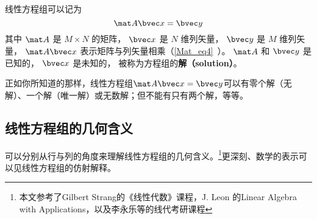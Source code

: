 
\begin{issues}
\issueDraft
\end{issues}


线性方程组可以记为
\begin{equation}\label{LinEq_eq1}
\mat A \bvec x = \bvec y
\end{equation}
其中 $\mat A$ 是 $M \times N$ 的矩阵， $\bvec x$ 是 $N$ 维列矢量， $\bvec y$ 是 $M$ 维列矢量， $\mat A \bvec x$ 表示矩阵与列矢量相乘（\autoref{Mat_eq4}~）。 $\mat A$ 和 $\bvec y$ 是已知的， $\bvec x$ 是未知的， 被称为方程组的\textbf{解（solution）}。

正如你所知道的那样，线性方程组$\mat A \bvec x=\bvec y$可以有零个解（无解）、一个解（唯一解）或无数解；但不能有只有两个解，等等。


\subsection{线性方程组的几何含义}\label{LinEq_sub2}
可以分别从行与列的角度来理解线性方程组的几何含义。\footnote{本文参考了Gilbert Strang的《线性代数》课程，J. Leon 的Linear Algebra with Applications，以及李永乐等的线代考研课程}更深刻、数学的表示可以见线性方程组的仿射解释。

